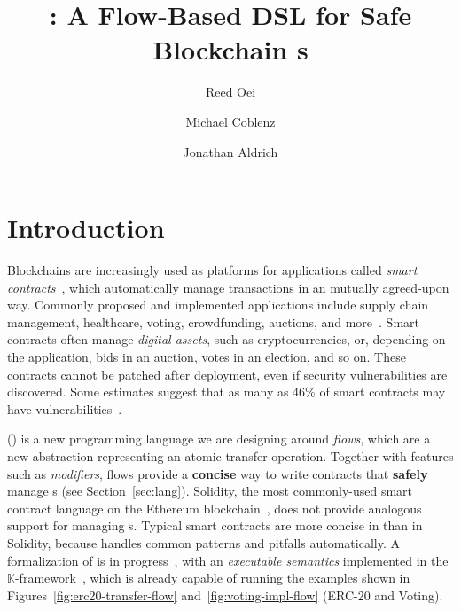 \documentclass[dvipsnames,runningheads]{llncs}
\begin{document}
\title{\langName: A Flow-Based DSL for Safe Blockchain \AssetTxt{}s}

\author{Reed Oei \and Michael Coblenz \and Jonathan Aldrich}

\maketitle

\section{Introduction}
Blockchains are increasingly used as platforms for applications called \emph{smart contracts}~\cite{Szabo97:Formalizing}, which automatically manage transactions in an mutually agreed-upon way.
Commonly proposed and implemented applications include supply chain management, healthcare, voting, crowdfunding, auctions, and more~\cite{SupplyChainUse,HealthcareUse,Elsden18:Making}.
Smart contracts often manage \emph{digital assets}, such as cryptocurrencies, or, depending on the application, bids in an auction, votes in an election, and so on.
These contracts cannot be patched after deployment, even if security vulnerabilities are discovered.
Some estimates suggest that as many as 46\% of smart contracts may have vulnerabilities~\cite{luuOyente}.

\langName (\langNamePronounce) is a new programming language we are designing around \emph{flows}, which are a new abstraction representing an atomic transfer operation.
Together with features such as \emph{modifiers}, flows provide a \textbf{concise} way to write contracts that \textbf{safely} manage \assetTxt{}s (see Section~\ref{sec:lang}).
Solidity, the most commonly-used smart contract language on the Ethereum blockchain~\cite{EthereumForDevs}, does not provide analogous support for managing \assetTxt{}s.
Typical smart contracts are more concise in \langName than in Solidity, because \langName handles common patterns and pitfalls automatically.
A formalization of \langName is in progress~\cite{psamatheRepo}, with an \emph{executable semantics} implemented in the $\mathbb{K}$-framework~\cite{rosu-serbanuta-2010-jlap}, which is already capable of running the examples shown in Figures~\ref{fig:erc20-transfer-flow} and~\ref{fig:voting-impl-flow} (ERC-20 and Voting).
\end{document}
